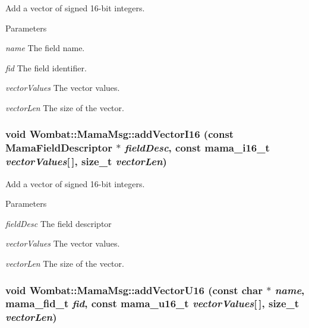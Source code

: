 Add a vector of signed 16-\/bit integers. 
\begin{DoxyParams}{Parameters}
\item[{\em name}]The field name. \item[{\em fid}]The field identifier. \item[{\em vectorValues}]The vector values. \item[{\em vectorLen}]The size of the vector. \end{DoxyParams}
\hypertarget{classWombat_1_1MamaMsg_af78932656fc139326d0b92dedb085fd3}{
\subsubsection[{addVectorI16}]{\setlength{\rightskip}{0pt plus 5cm}void Wombat::MamaMsg::addVectorI16 (const {\bf MamaFieldDescriptor} $\ast$ {\em fieldDesc}, \/  const mama\_\-i16\_\-t {\em vectorValues}\mbox{[}$\,$\mbox{]}, \/  size\_\-t {\em vectorLen})}}
\label{classWombat_1_1MamaMsg_af78932656fc139326d0b92dedb085fd3}


Add a vector of signed 16-\/bit integers. 
\begin{DoxyParams}{Parameters}
\item[{\em fieldDesc}]The field descriptor \item[{\em vectorValues}]The vector values. \item[{\em vectorLen}]The size of the vector. \end{DoxyParams}
\hypertarget{classWombat_1_1MamaMsg_ac8c52f630ea1507cd4fffac8cd1d69ef}{
\subsubsection[{addVectorU16}]{\setlength{\rightskip}{0pt plus 5cm}void Wombat::MamaMsg::addVectorU16 (const char $\ast$ {\em name}, \/  mama\_\-fid\_\-t {\em fid}, \/  const mama\_\-u16\_\-t {\em vectorValues}\mbox{[}$\,$\mbox{]}, \/  size\_\-t {\em vectorLen})}}
\label{classWombat_1_1MamaMsg_ac8c52f630ea1507cd4fffac8cd1d69ef}


